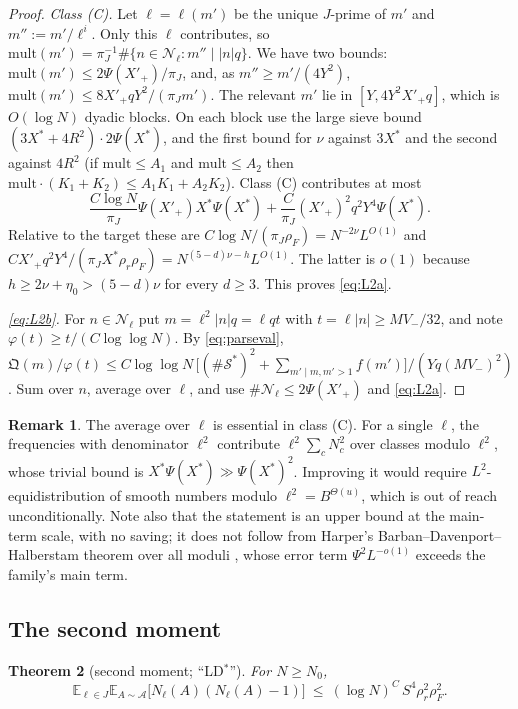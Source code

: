 \documentclass[11pt]{amsart}
\newtheorem{theorem}{Theorem}[section]
\theoremstyle{definition}
\newtheorem{remark}[theorem]{Remark}
\newcommand{\cA}{\mathcal{A}}
\newcommand{\cN}{\mathcal{N}}
\newcommand{\cS}{\mathcal{S}}
\newcommand{\fQ}{\mathfrak{Q}}
\newcommand{\Vm}{V_{-}}
\newcommand{\XF}{X^{*}}
\newcommand{\rr}{\rho_r}
\newcommand{\rF}{\rho_F}
\newcommand{\Ex}{\mathbb{E}}
\begin{document}
\begin{proof}
\emph{Class (C).} Let $\ell=\ell(m')$ be the unique $J$-prime of $m'$ and $m'':=m'/\ell^i$. Only this $\ell$ contributes, so
$\mathrm{mult}(m')=\pi_J^{-1}\#\{n\in\cN_\ell:m''\mid|n|q\}$. We have two bounds: $\mathrm{mult}(m')\le2\Psi(X'_+)/\pi_J$, and, as $m''\ge m'/(4Y^2)$,
$\mathrm{mult}(m')\le8X'_+qY^2/(\pi_Jm')$. The relevant $m'$ lie in $[Y,4Y^2X'_+q]$, which is $O(\log N)$ dyadic blocks. On each block
use the large sieve bound $(3\XF+4R^2)\cdot2\Psi(\XF)$, and the first bound for $\nu$ against $3\XF$ and the second against $4R^2$
(if $\mathrm{mult}\le A_1$ and $\mathrm{mult}\le A_2$ then $\mathrm{mult}\cdot(K_1+K_2)\le A_1K_1+A_2K_2$). Class (C) contributes at most
\[
\frac{C\log N}{\pi_J}\Psi(X'_+)\XF\Psi(\XF)+\frac{C}{\pi_J}(X'_+)^2q^2Y^4\Psi(\XF).
\]
Relative to the target these are $C\log N/(\pi_J\rF)=N^{-2\nu}L^{O(1)}$ and $CX'_+q^2Y^4/(\pi_J\XF\rr\rF)=N^{(5-d)\nu-h}L^{O(1)}$. The
latter is $o(1)$ because $h\ge2\nu+\eta_0>(5-d)\nu$ for every $d\ge3$. This proves \eqref{eq:L2a}.

\emph{\eqref{eq:L2b}.} For $n\in\cN_\ell$ put $m=\ell^2|n|q=\ell q t$ with $t=\ell|n|\ge M\Vm/32$, and note $\varphi(t)\ge t/(C\log\log N)$. By
\eqref{eq:parseval}, $\fQ(m)/\varphi(t)\le C\log\log N\,\bigl[(\#\cS^*)^2+\sum_{m'\mid m,m'>1}f(m')\bigr]/(Yq(M\Vm)^2)$. Sum over $n$,
average over $\ell$, and use $\#\cN_\ell\le2\Psi(X'_+)$ and \eqref{eq:L2a}.
\end{proof}

\begin{remark}
The average over $\ell$ is essential in class (C). For a single $\ell$, the frequencies with denominator $\ell^2$
contribute $\ell^2\sum_cN_c^2$ over classes modulo $\ell^2$, whose trivial bound is $\XF\Psi(\XF)\gg\Psi(\XF)^2$. Improving it would
require $L^2$-equidistribution of smooth numbers modulo $\ell^2=B^{\Theta(u)}$, which is out of reach unconditionally. Note also that the
statement is an upper bound at the main-term scale, with no saving; it does not follow from Harper's
Barban--Davenport--Halberstam theorem over all moduli \cite[Thm.~2]{harper2012}, whose error term $\Psi^2L^{-o(1)}$ exceeds the
family's main term.
\end{remark}

\subsection{The second moment}

\begin{theorem}[second moment; ``LD$^*$'']\label{thm:LD}
For $N\ge N_0$,
\[
\Ex_{\ell\in J}\Ex_{A\sim\cA}\bigl[N_\ell(A)(N_\ell(A)-1)\bigr]\ \le\ (\log N)^C\,S^4\rr^2\rF^2.
\]
\end{theorem}
\end{document}
